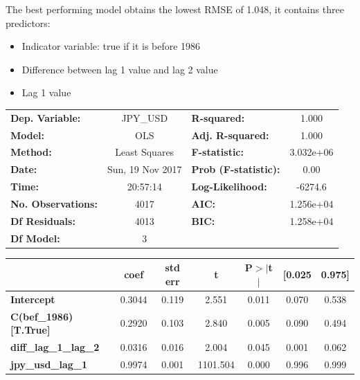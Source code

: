 \documentclass[]{article}
\begin{document}
The best performing model obtains the lowest RMSE of 1.048, it contains three predictors: 
\begin{itemize}
	\item Indicator variable: true if it is before 1986
	\item Difference between lag 1 value and lag 2 value
	\item Lag 1 value
\end{itemize}

\begin{center}
	\begin{tabular}{lclc}
		\toprule
		\textbf{Dep. Variable:}       &     JPY\_USD      & \textbf{  R-squared:         } &     1.000   \\
		\textbf{Model:}               &       OLS        & \textbf{  Adj. R-squared:    } &     1.000   \\
		\textbf{Method:}              &  Least Squares   & \textbf{  F-statistic:       } & 3.032e+06   \\
		\textbf{Date:}                & Sun, 19 Nov 2017 & \textbf{  Prob (F-statistic):} &     0.00    \\
		\textbf{Time:}                &     20:57:14     & \textbf{  Log-Likelihood:    } &   -6274.6   \\
		\textbf{No. Observations:}    &        4017      & \textbf{  AIC:               } & 1.256e+04   \\
		\textbf{Df Residuals:}        &        4013      & \textbf{  BIC:               } & 1.258e+04   \\
		\textbf{Df Model:}            &           3      & \textbf{                     } &             \\
		\bottomrule
	\end{tabular}
	\begin{tabular}{lcccccc}
		& \textbf{coef} & \textbf{std err} & \textbf{t} & \textbf{P$>$$|$t$|$} & \textbf{[0.025} & \textbf{0.975]}  \\
		\midrule
		\textbf{Intercept}            &       0.3044  &        0.119     &     2.551  &         0.011        &        0.070    &        0.538     \\
		\textbf{C(bef\_1986)[T.True]} &       0.2920  &        0.103     &     2.840  &         0.005        &        0.090    &        0.494     \\
		\textbf{diff\_lag\_1\_lag\_2} &       0.0316  &        0.016     &     2.004  &         0.045        &        0.001    &        0.062     \\
		\textbf{jpy\_usd\_lag\_1}     &       0.9974  &        0.001     &  1101.504  &         0.000        &        0.996    &        0.999     \\

\end{tabular}
\end{center}
\end{document}
